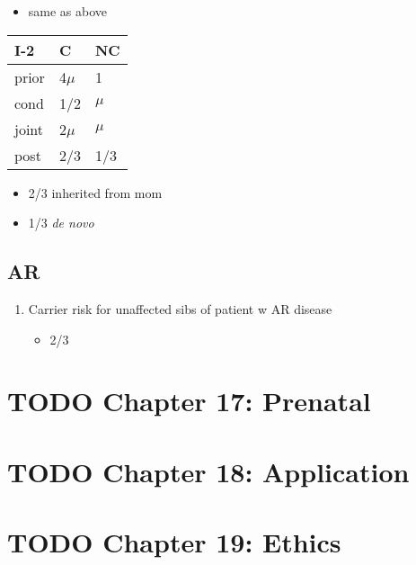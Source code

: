 \documentclass{scrartcl}
\begin{document}
\begin{enumerate}
\begin{itemize}
\item same as above
\end{itemize}

\begin{center}
\begin{tabular}{lll}
I-2 & C & NC\\
\hline
prior & 4\(\mu\) & 1\\
cond \footnotemark & 1/2 & \(\mu\)\\
joint & 2\(\mu\) & \(\mu\)\\
post & 2/3 & 1/3\\
\end{tabular}
\end{center}


\begin{itemize}
\item 2/3 inherited from mom
\item 1/3 \emph{de novo}
\end{itemize}
\end{enumerate}
\subsection{AR}
\label{sec:orgbc34945}
\begin{enumerate}
\item Carrier risk for unaffected sibs of patient w AR disease
\label{sec:org6a6edf3}
\begin{itemize}
\item 2/3
\end{itemize}
\end{enumerate}

\section{{\bfseries\sffamily TODO} Chapter 17: Prenatal}
\label{sec:org5ad1463}
\section{{\bfseries\sffamily TODO} Chapter 18: Application}
\label{sec:org4813777}
\section{{\bfseries\sffamily TODO} Chapter 19: Ethics}
\label{sec:orgf672705}
\end{document}
